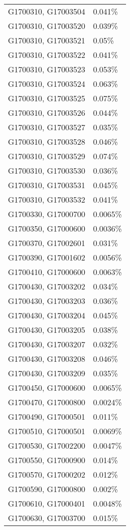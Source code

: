 \begin{longtable}[]{@{}ll@{}}
G1700310, G17003504 & 0.041\% \\
G1700310, G17003520 & 0.039\% \\
G1700310, G17003521 & 0.05\% \\
G1700310, G17003522 & 0.041\% \\
G1700310, G17003523 & 0.053\% \\
G1700310, G17003524 & 0.063\% \\
G1700310, G17003525 & 0.075\% \\
G1700310, G17003526 & 0.044\% \\
G1700310, G17003527 & 0.035\% \\
G1700310, G17003528 & 0.046\% \\
G1700310, G17003529 & 0.074\% \\
G1700310, G17003530 & 0.036\% \\
G1700310, G17003531 & 0.045\% \\
G1700310, G17003532 & 0.041\% \\
G1700330, G17000700 & 0.0065\% \\
G1700350, G17000600 & 0.0036\% \\
G1700370, G17002601 & 0.031\% \\
G1700390, G17001602 & 0.0056\% \\
G1700410, G17000600 & 0.0063\% \\
G1700430, G17003202 & 0.034\% \\
G1700430, G17003203 & 0.036\% \\
G1700430, G17003204 & 0.045\% \\
G1700430, G17003205 & 0.038\% \\
G1700430, G17003207 & 0.032\% \\
G1700430, G17003208 & 0.046\% \\
G1700430, G17003209 & 0.035\% \\
G1700450, G17000600 & 0.0065\% \\
G1700470, G17000800 & 0.0024\% \\
G1700490, G17000501 & 0.011\% \\
G1700510, G17000501 & 0.0069\% \\
G1700530, G17002200 & 0.0047\% \\
G1700550, G17000900 & 0.014\% \\
G1700570, G17000202 & 0.012\% \\
G1700590, G17000800 & 0.002\% \\
G1700610, G17000401 & 0.0048\% \\
G1700630, G17003700 & 0.015\% \\

\end{longtable}
